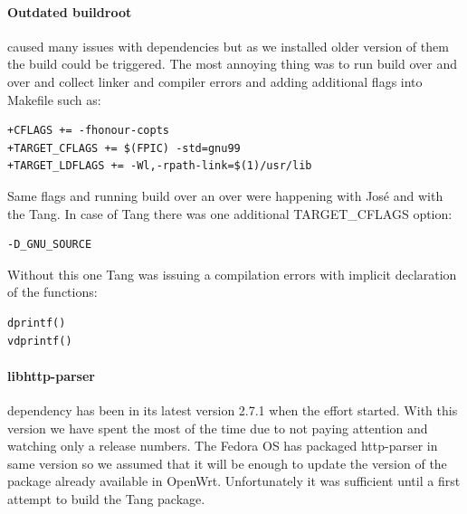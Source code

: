 \paragraph{Outdated buildroot} caused many issues with dependencies but as we installed older version of them the build could be triggered.
The most annoying thing was to run build over and over and collect linker and compiler errors and adding additional flags into Makefile such as:
\begin{lstlisting}[columns=fixed,basicstyle=\ttfamily\footnotesize,tabsize=4,backgroundcolor=\color{yellow!10}]
+CFLAGS += -fhonour-copts
+TARGET_CFLAGS += $(FPIC) -std=gnu99
+TARGET_LDFLAGS += -Wl,-rpath-link=$(1)/usr/lib
\end{lstlisting}
Same flags and running build over an over were happening with José and with the Tang.
In case of Tang there was one additional TARGET\_CFLAGS option:
\begin{lstlisting}[columns=fixed,basicstyle=\ttfamily\footnotesize,tabsize=4,backgroundcolor=\color{yellow!10}]
-D_GNU_SOURCE
\end{lstlisting}
Without this one Tang was issuing a compilation errors with implicit declaration of the functions:
\begin{lstlisting}[columns=fixed,basicstyle=\ttfamily\footnotesize,tabsize=4,backgroundcolor=\color{yellow!10}]
dprintf()
vdprintf()
\end{lstlisting}

\paragraph{libhttp-parser} dependency has been in its latest version 2.7.1 when the effort started.
With this version we have spent the most of the time due to not paying attention and watching only a release numbers.
The Fedora OS has packaged http-parser in same version so we assumed that it will be enough to update the version of the package already available in OpenWrt.
Unfortunately it was sufficient until a first attempt to build the Tang package.

